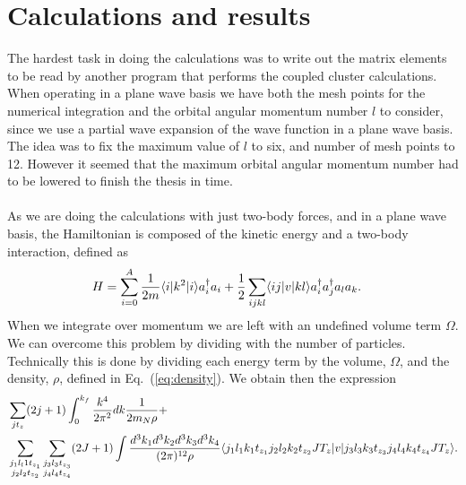 \chapter{Calculations and results}

The hardest task in doing the calculations was to write out the matrix
elements to be read by another program that performs the coupled
cluster calculations.%
\\
When operating in a plane wave basis we have both the mesh points for the numerical
integration and the orbital angular momentum number $l$  to consider, since we use a
partial wave expansion of the wave function in a plane wave basis. 
The idea was to fix the maximum value of $l$ to six, and
number of mesh points to 12. However it seemed that the maximum orbital angular
momentum number had to be lowered to finish the thesis in time.\\%
\\
As we are doing the calculations with just two-body forces, and in a plane wave
basis, the Hamiltonian is composed of the kinetic energy  and a
two-body interaction, defined as
\begin{equation*}
		\begin{split}
				&H=\sum_{i=0}^A\frac{1}{2m}\langle i|k^2|i\rangle a^\dagger_ia_i + \frac{1}{2}\sum_{ijkl}\langle ij|v|kl\rangle a^\dagger_ia^\dagger_ja_la_k.
		\end{split}
\end{equation*}
When we integrate over momentum we are left with an undefined volume term
$\Omega$. We can overcome this problem by dividing with the number of particles. 
Technically this is done by dividing each energy term by the volume, $\Omega$, and 
the density, $\rho$, defined in Eq.~(\eqref{eq:density}). We obtain then the expression
\begin{equation*}
		\begin{split}
			&	 \sum_{jt_z} (2j+1)\int _0^{k_f}\frac{k^4}{2\pi^2}dk\frac{1}{2m_N\rho}+\\
			&	\sum_{\substack{j_1l_l1t_{z_1}\\j_2l_2t_{z_2}}}\sum_{\substack{j_3l_3t_{z_3}\\j_4l_4t_{z_4}}}(2J+1)\int \frac{d^3k_1 d^3k_2 d^3k_3 d^3k_4}{(2\pi)^{12}\rho}\langle j_1l_1k_1t_{z_1}j_2l_2k_2t_{z_2}JT_z|v
				|j_3l_3k_3t_{z_3}j_4l_4k_4t_{z_4}JT_z\rangle.
		\end{split}
\end{equation*}
